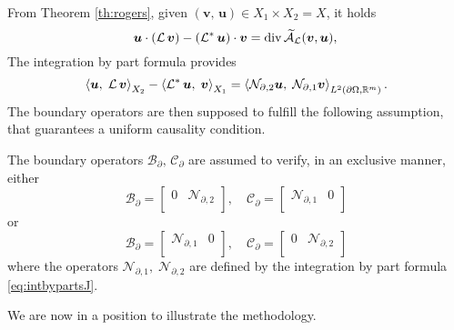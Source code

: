 From Theorem \ref{th:rogers}, given $(\bm{v}, \, \bm{u}) \in X_1 \times X_2 = X$, it holds
\begin{equation}
{\bm{u}} \cdot {(\mathcal{L}\, \bm{v})}  - {(\mathcal{L}^* \, \bm{u})} \cdot {\bm{v}} = \div \widetilde{\mathcal{A}}_{\mathcal{L}}(\bm{v}, \bm{u}), \\
\end{equation}
The integration by part formula provides 
\begin{equation}
 \inner[X_2]{\bm{u}}{\mathcal{L}\,\bm{v}} - \inner[X_1]{\mathcal{L}^* \, \bm{u}}{\bm{v}} = \inner[L^2(\partial \Omega, \mathbb{R}^m)]{\mathcal{N}_{\partial, 2} \bm{u}}{\mathcal{N}_{\partial, 1} \bm{v}}. \label{eq:intbypartsJ} 
\end{equation}
The boundary operators are then supposed to fulfill the following assumption, that guarantees a uniform causality condition.

\begin{assumption}\label{ass:operBC}
	 The boundary operators $\mathcal{B}_\partial, \, \mathcal{C}_\partial$ are assumed to verify, in an exclusive manner, either
	\begin{equation}\label{eq:ass1BC}
	\mathcal{B}_\partial = \begin{bmatrix}
	0 & \mathcal{N}_{\partial, 2} \\
	\end{bmatrix}, \quad 
	\mathcal{C}_\partial = \begin{bmatrix}
	\mathcal{N}_{\partial, 1} & 0 \\
	\end{bmatrix}
	\end{equation}
	or 
	\begin{equation}\label{eq:ass2BC}
	\mathcal{B}_\partial = \begin{bmatrix}
	\mathcal{N}_{\partial, 1} & 0 \\
	\end{bmatrix}, \quad \mathcal{C}_\partial = \begin{bmatrix}
	0 & \mathcal{N}_{\partial, 2} \\
	\end{bmatrix}
	\end{equation}
	where the operators $\mathcal{N}_{\partial, 1}, \; \mathcal{N}_{\partial, 2}$ are defined by the integration by part formula \eqref{eq:intbypartsJ}. 

\end{assumption}
We are now in a position to illustrate the methodology. 

